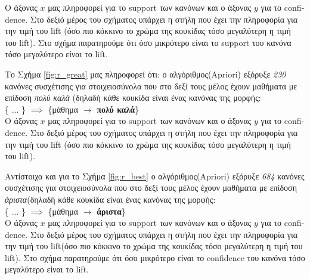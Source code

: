 \documentclass[12pt,a4paper,final]{article}
\begin{document}
Ο άξονας $x$ μας πληροφορεί για το \foreignlanguage{english}{support} των κανόνων και ο άξονας $y$ για το \foreignlanguage{english}{confidence}. Στο δεξιό μέρος του σχήματος υπάρχει η στήλη που έχει την πληροφορία για την τιμή του \foreignlanguage{english}{lift} (όσο πιο κόκκινο το χρώμα της κουκίδας τόσο μεγαλύτερη η τιμή του \foreignlanguage{english}{lift}). Στο σχήμα παρατηρούμε ότι όσο μικρότερο είναι το  \foreignlanguage{english}{support} του κανόνα τόσο μεγαλύτερο είναι το \foreignlanguage{english}{lift}.\medskip

Το Σχήμα \ref{fig:r_great} μας πληροφορεί ότι: ο αλγόριθμος(\foreignlanguage{english}{Apriori}) εξόρυξε \textit{230} κανόνες συσχέτισης για στοιχειοσύνολα που στο δεξί τους μέλος έχουν μαθήματα με επίδοση \textit{πολύ καλά} (δηλαδή κάθε κουκίδα είναι ένας κανόνας της μορφής: \\

\{ ... \} $ \implies $ \{μάθημα $\to$ \textbf{πολύ καλά}\} \\

Ο άξονας $x$ μας πληροφορεί για το \foreignlanguage{english}{support} των κανόνων και ο άξονας $y$ για το \foreignlanguage{english}{confidence}. Στο δεξιό μέρος του σχήματος υπάρχει η στήλη που έχει την πληροφορία για την τιμή του \foreignlanguage{english}{lift} (όσο πιο κόκκινο το χρώμα της κουκίδας τόσο μεγαλύτερη η τιμή του \foreignlanguage{english}{lift}).\medskip

 Αντίστοιχα και για το Σχήμα \ref{fig:r_best} ο αλγόριθμος(\foreignlanguage{english}{Apriori}) εξόρυξε \textit{684} κανόνες συσχέτισης για στοιχειοσύνολα που στο δεξί τους μέλος έχουν μαθήματα με επίδοση \textit{άριστα}(δηλαδή κάθε κουκίδα είναι ένας κανόνας της μορφής: \\

\{ ... \} $\implies$ \{μάθημα $\to$ \textbf{άριστα}\} \\

Ο άξονας $x$ μας πληροφορεί για το \foreignlanguage{english}{support} των κανόνων και ο άξονας $y$ για το \foreignlanguage{english}{confidence}. Στο δεξιό μέρος του σχήματος υπάρχει η στήλη που έχει την πληροφορία για την τιμή του \foreignlanguage{english}{lift}(όσο πιο κόκκινο το χρώμα της κουκίδας τόσο μεγαλύτερη η τιμή του \foreignlanguage{english}{lift}). Στο σχήμα παρατηρούμε ότι όσο μικρότερο είναι το  \foreignlanguage{english}{confidence} του κανόνα τόσο μεγαλύτερο είναι το \foreignlanguage{english}{lift}.\medskip
\end{document}
